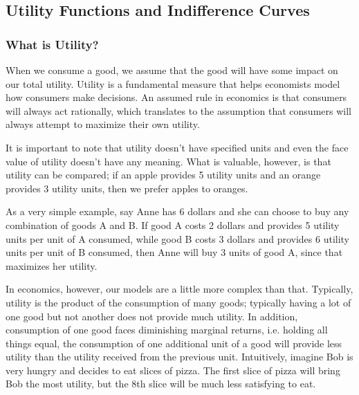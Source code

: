 \documentclass[letterpaper,10pt,english]{jupyterBook}
\begin{document}
\subsection{Utility Functions and Indifference Curves}
\label{\detokenize{content/05-utility/utility:utility-functions-and-indifference-curves}}\label{\detokenize{content/05-utility/utility::doc}}

\subsubsection{What is Utility?}
\label{\detokenize{content/05-utility/utility:what-is-utility}}
\sphinxAtStartPar
When we consume a good, we assume that the good will have some impact on our total utility. Utility is a fundamental measure that helps economists model how consumers make decisions. An assumed rule in economics is that consumers will always act rationally, which translates to the assumption that consumers will always attempt to maximize their own utility.

\sphinxAtStartPar
It is important to note that utility doesn’t have specified units and even the face value of utility doesn’t have any meaning.  What is valuable, however, is that utility can be compared; if an apple provides 5 utility units and an orange provides 3 utility units, then we prefer apples to oranges.

\sphinxAtStartPar
As a very simple example, say Anne has 6 dollars and she can choose to buy any combination of goods A and B. If good A costs 2 dollars and provides 5 utility units per unit of A consumed, while good B costs 3 dollars and provides 6 utility units per unit of B consumed, then Anne will buy 3 units of good A, since that maximizes her utility.

\sphinxAtStartPar
In economics, however, our models are a little more complex than that. Typically, utility is the product of the consumption of many goods; typically having a lot of one good but not another does not provide much utility. In addition, consumption of one good faces diminishing marginal returns, i.e. holding all things equal, the consumption of one additional unit of a good will provide less utility than the utility received from the previous unit. Intuitively, imagine Bob is very hungry and decides to eat slices of pizza. The first slice of pizza will bring Bob the most utility, but the 8th slice will be much less satisfying to eat.
\end{document}
